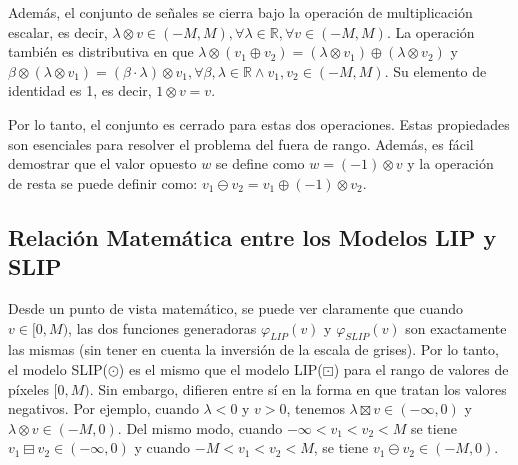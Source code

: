 Además, el conjunto de señales se cierra bajo la operación de multiplicación escalar, es decir, $\lambda \otimes v \in (-M, M), \forall \lambda \in \mathbb{R}, \forall v \in (-M, M)$. La operación también es distributiva en que $\lambda \otimes (v_1\oplus v_2) = (\lambda \otimes v_1 )\oplus (\lambda\otimes v_2)$ y $\beta\otimes (\lambda\otimes v_1 ) = (\beta \cdot \lambda)\otimes v_1, \forall \beta, \lambda \in \mathbb{R} \land v_1 , v_2 \in (-M, M)$. Su elemento de identidad es 1, es decir, $1\otimes v = v $.

Por lo tanto, el conjunto es cerrado para estas dos operaciones. Estas propiedades son esenciales para resolver el problema del fuera de rango. Además, es fácil demostrar que el valor opuesto $w$ se define como $w = (-1)\otimes v$ y la operación de resta se puede definir como: $v_1\ominus v_2=v_1\oplus(-1)\otimes v_2$.

\subsection{Relación Matemática entre los Modelos LIP y SLIP}

Desde un punto de vista matemático, se puede ver claramente que cuando $v \in [0, M)$, las dos funciones generadoras $\varphi_{LIP}(v)$ y $\varphi_{SLIP}(v)$ son exactamente las mismas (sin tener en cuenta la inversi\'on de la escala de grises). Por lo tanto, el modelo SLIP($\odot$) es el mismo que el modelo LIP($\boxdot$) para el rango de valores de píxeles $[0, M)$. Sin embargo, difieren entre sí en la forma en que tratan los valores negativos.  Por ejemplo, cuando $\lambda < 0$ y $v > 0$, tenemos $\lambda\boxtimes v \in (-\infty, 0)$ y $\lambda \otimes v \in (-M, 0)$. Del mismo modo, cuando $-\infty < v_1 < v_2 < M$ se tiene $v_1 \boxminus v_2 \in (-\infty, 0)$ y cuando $-M < v_1 < v_2 < M$, se tiene $v_1\ominus v_2 \in (-M, 0)$. 
